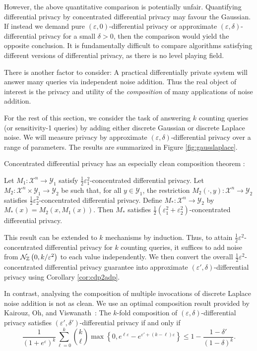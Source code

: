 \documentclass{jpc}
\newcommand{\dgausss}[2]{{\discN\left(#1,#2\right)}}
\newcommand{\dgauss}[1]{\dgausss{0}{#1}}
\begin{document}
However, the above quantitative comparison is potentially unfair. Quantifying differential privacy by concentrated differential privacy may favour the Gaussian. If instead we demand pure $(\varepsilon,0)$-differential privacy or approximate $(\varepsilon,\delta)$-differential privacy for a small $\delta>0$, then the comparison would yield the opposite conclusion. It is fundamentally difficult to compare algorithms satisfying different versions of differential privacy, as there is no level playing field.

There is another factor to consider: A practical differentially private system will answer many queries via independent noise addition. Thus the real object of interest is the privacy and utility of the \emph{composition} of many applications of noise addition.

For the rest of this section, we consider the task of answering $k$ counting queries (or sensitivity-1 queries) by adding either discrete Gaussian or discrete Laplace noise. We will measure privacy by approximate $(\varepsilon,\delta)$-differential privacy over a range of parameters. The results are summarized in Figure \ref{fig:gausslaplace}.

Concentrated differential privacy has an especially clean composition theorem \citep{BunS16}:
\begin{lem}
Let $M_1\colon \mathcal{X}^n \to \mathcal{Y}_1$ satisfy $\frac12\varepsilon_1^2$-concentrated differential privacy. Let $M_2\colon \mathcal{X}^n \times \mathcal{Y}_1 \to \mathcal{Y}_2$ be such that, for all $y \in \mathcal{Y}_1$, the restriction $M_2(\cdot,y)\colon \mathcal{X}^n \to \mathcal{Y}_2$ satisfies $\frac12\varepsilon_2^2$-concentrated differential privacy. Define $M_*\colon \mathcal{X}^n \to \mathcal{Y}_2$ by $M_*(x) = M_2(x,M_1(x))$. Then $M_*$ satisfies $\frac12(\varepsilon_1^2+\varepsilon_2^2)$-concentrated differential privacy.
\end{lem}
This result can be extended to $k$ mechanisms by induction. 
Thus, to attain $\frac12\varepsilon^2$-concentrated differential privacy for $k$ counting queries, it suffices to add noise from $\dgauss{k/\varepsilon^2}$ to each value independently. We then convert the overall $\frac12\varepsilon^2$-concentrated differential privacy guarantee into approximate $(\varepsilon',\delta)$-differential privacy using Corollary \ref{cor:cdp2adp}.

In contrast, analysing the composition of multiple invocations of discrete Laplace noise addition is not as clean. We use an optimal composition result provided by Kairouz, Oh, and Viswanath~\citep{KairouzOV17,MurtaghV16}:
The $k$-fold composition of $(\varepsilon,\delta)$-differential privacy satisfies $(\varepsilon',\delta')$-differential privacy if and only if
\begin{equation}
    \frac{1}{(1+e^\varepsilon)^k}\sum_{\ell=0}^k {k \choose \ell} \max\left\{ 0 , e^{\ell\varepsilon} - e^{\varepsilon' + (k-\ell)\varepsilon} \right\} \le 1 - \frac{1-\delta'}{(1-\delta)^k}.
\end{equation}
\end{document}
